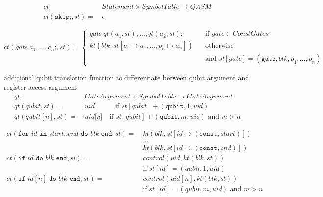 \begin{align*}
    ct : \ & Statement \times SymbolTable \to QASM\\
    ct(\texttt{skip;}, st) = \ & \epsilon
\end{align*}

\begin{equation*}
    ct(gate \ a_1, \dots, a_n\texttt{;}, st) = 
    \begin{cases}
        gate \ qt(a_1, st), \dots, qt(a_2, st); \quad &\text{if } gate \in ConstGates\\
        kt(blk, st[p_1 \mapsto a_1, \dots, p_n \mapsto a_n]) \quad &\text{otherwise }\\
        &\text{and } st[gate] = (\texttt{gate}, blk, p_1, \dots, p_n)
    \end{cases}
\end{equation*}

additional qubit translation function to differentiate between qubit argument and register access argument
\begin{align*}
    qt :\ & \displaystyle GateArgument \times SymbolTable \to GateArgument\\
    qt(qubit, st) = \ & uid \quad\quad\quad \text{if } st[qubit] + (\texttt{qubit}, 1, uid)\\
    qt(qubit[n], st) = \ & uid\texttt{[}n\texttt{]} \quad \text{if } st[qubit] + (\texttt{qubit}, m, uid) \text{ and } m > n
\end{align*}

\begin{align*}
    ct(\texttt{for } id \texttt{ in } start\texttt{..}end \texttt{ do } blk \texttt{ end}, st) = \ 
        & kt(blk, st[id \mapsto (\texttt{const}, start)])\\
        & \dots\\
        & kt(blk, st[id \mapsto (\texttt{const}, end)])\\
        ct(\texttt{if } id \texttt{ do } blk \texttt{ end}, st) = \ 
            &  control(uid, kt(blk, st)) \\
            & \text{if } st[id] = (qubit, 1, uid)\\
        ct(\texttt{if } id[n] \texttt{ do } blk \texttt{ end}, st) = \ 
            &  control(uid[n], kt(blk, st)) \\
            & \text{if } st[id] = (qubit, m, uid) \text{ and } m > n
\end{align*}

